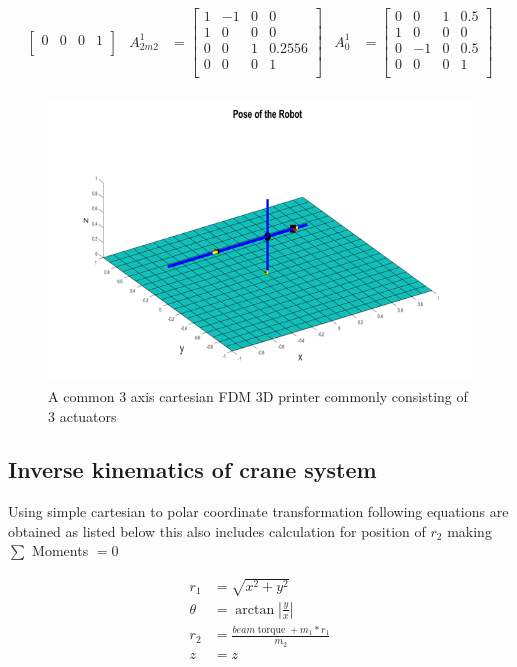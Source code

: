 \documentclass{UoNMCHA}
\numberwithin{equation}{section}
\begin{document}
\begin{align*}
\begin{bmatrix}
	0 & 0 & 0 & 1\\
	\end{bmatrix} & 		
	A_{2m2}^1 &= 
	\begin{bmatrix}
	1 & -1 & 0 & 0 \\
	1 & 0 & 0 & 0\\
	0 & 0 & 1 & 0.2556\\
	0 & 0 & 0 & 1\\
	\end{bmatrix} &	
	A_0^1 &= 
	\begin{bmatrix}
	0 & 0 & 1 & 0.5 \\
	1 & 0 & 0 & 0\\
	0 & -1 & 0 & 0.5\\
	0 & 0 & 0 & 1\\
	\end{bmatrix} \\
\end{align*}

\begin{figure}[H]
	\begin{center}
		\includegraphics[width=.5\linewidth]{figs/Picture8}
		\caption{A  common 3 axis cartesian FDM 3D printer commonly consisting of 3 actuators}
		\label{figs/Picture8}
	\end{center}
\end{figure}

\subsection{Inverse kinematics of crane system}

Using simple cartesian to polar coordinate transformation following equations are obtained as listed
below this also includes calculation for position of $r_{2}$ making $\sum$ Moments $=0$

\begin{align}
	 r_{1} & =\sqrt{x^{2}+y^{2}} \\ 
	\theta & =\arctan \left|\frac{y}{x}\right| \\
	r_{2} &=\frac{b e a m \operatorname{torque}+m_{1} * r_{1}}{m_{2}} \\ 
	z & =z 
\end{align}
\end{document}
